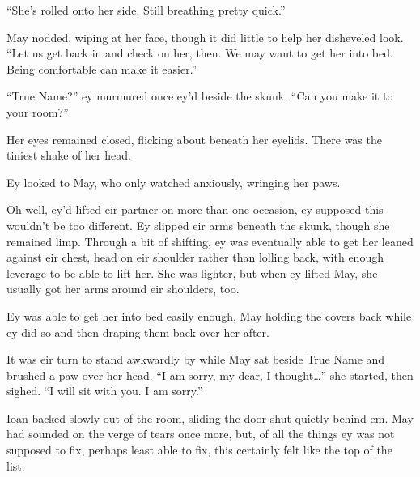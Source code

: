 ``She's rolled onto her side. Still breathing pretty quick.''

May nodded, wiping at her face, though it did little to help her disheveled look. ``Let us get back in and check on her, then. We may want to get her into bed. Being comfortable can make it easier.''

``True Name?'' ey murmured once ey'd beside the skunk. ``Can you make it to your room?''

Her eyes remained closed, flicking about beneath her eyelids. There was the tiniest shake of her head.

Ey looked to May, who only watched anxiously, wringing her paws.

Oh well, ey'd lifted eir partner on more than one occasion, ey supposed this wouldn't be too different. Ey slipped eir arms beneath the skunk, though she remained limp. Through a bit of shifting, ey was eventually able to get her leaned against eir chest, head on eir shoulder rather than lolling back, with enough leverage to be able to lift her. She was lighter, but when ey lifted May, she usually got her arms around eir shoulders, too.

Ey was able to get her into bed easily enough, May holding the covers back while ey did so and then draping them back over her after.

It was eir turn to stand awkwardly by while May sat beside True Name and brushed a paw over her head. ``I am sorry, my dear, I thought\ldots{}'' she started, then sighed. ``I will sit with you. I am sorry.''

Ioan backed slowly out of the room, sliding the door shut quietly behind em. May had sounded on the verge of tears once more, but, of all the things ey was not supposed to fix, perhaps least able to fix, this certainly felt like the top of the list.

